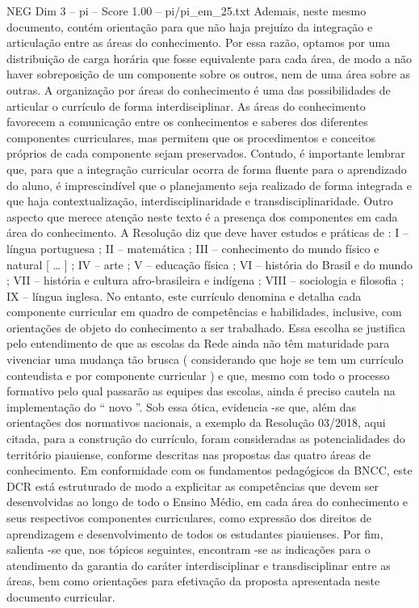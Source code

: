 \begin{textsample}{NEG Dim 3 – pi – Score 1.00 – pi/pi\_em\_25.txt}
Ademais, neste mesmo documento, contém orientação para que não haja prejuízo da integração e articulação entre as áreas do conhecimento.
Por essa razão, optamos por uma distribuição de carga horária que fosse equivalente para cada área, de modo a não haver sobreposição de um componente sobre os outros, nem de uma área sobre as outras.
A organização por áreas do conhecimento é uma das possibilidades de articular o currículo de forma interdisciplinar.
As áreas do conhecimento favorecem a comunicação entre os conhecimentos e saberes dos diferentes componentes curriculares, mas permitem que os procedimentos e conceitos próprios de cada componente sejam preservados.
Contudo, é importante lembrar que, para que a integração curricular ocorra de forma fluente para o aprendizado do aluno, é imprescindível que o planejamento seja realizado de forma integrada e que haja contextualização, interdisciplinaridade e transdisciplinaridade.
Outro aspecto que merece atenção neste texto é a presença dos componentes em cada área do conhecimento.
A Resolução diz que deve haver estudos e práticas de : I – língua portuguesa ; II – matemática ; III – conhecimento do mundo físico e natural [ … ] ; IV – arte ; V – educação física ; VI – história do Brasil e do mundo ; VII – história e cultura afro-brasileira e indígena ; VIII – sociologia e filosofia ; IX – língua inglesa.
No entanto, este currículo denomina e detalha cada componente curricular em quadro de competências e habilidades, inclusive, com orientações de objeto do conhecimento a ser trabalhado.
Essa escolha se justifica pelo entendimento de que as escolas da Rede ainda não têm maturidade para vivenciar uma mudança tão brusca ( considerando que hoje se tem um currículo conteudista e por componente curricular ) e que, mesmo com todo o processo formativo pelo qual passarão as equipes das escolas, ainda é preciso cautela na implementação do “ novo ”.
Sob essa ótica, evidencia -se que, além das orientações dos normativos nacionais, a exemplo da Resolução 03/2018, aqui citada, para a construção do currículo, foram consideradas as potencialidades do território piauiense, conforme descritas nas propostas das quatro áreas de conhecimento.
Em conformidade com os fundamentos pedagógicos da BNCC, este DCR está estruturado de modo a explicitar as competências que devem ser desenvolvidas ao longo de todo o Ensino Médio, em cada área do conhecimento e seus respectivos componentes curriculares, como expressão dos direitos de aprendizagem e desenvolvimento de todos os estudantes piauienses.
Por fim, salienta -se que, nos tópicos seguintes, encontram -se as indicações para o atendimento da garantia do caráter interdisciplinar e transdisciplinar entre as áreas, bem como orientações para efetivação da proposta apresentada neste documento curricular.

\end{textsample}
